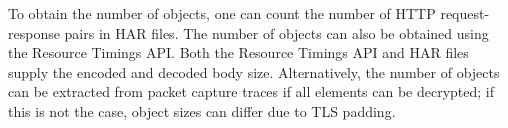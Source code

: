 To obtain the number of objects, one can count the number of HTTP request-response pairs in HAR files. The number of objects can also be obtained using the Resource Timings API. Both the Resource Timings API and HAR files supply the encoded and decoded body size. Alternatively, the number of objects can be extracted from packet capture traces if all elements can be decrypted; if this is not the case, object sizes can differ due to TLS padding.